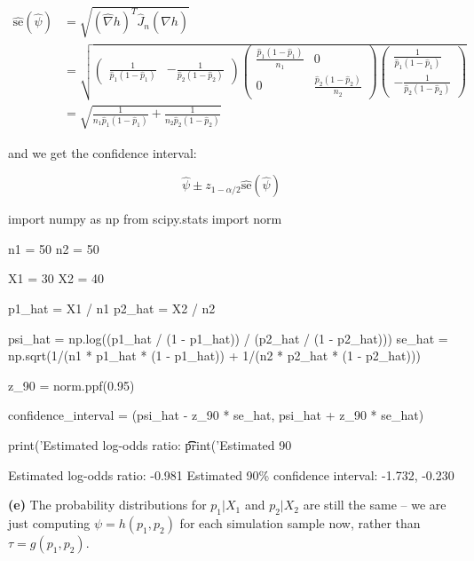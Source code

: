 \begin{align}
\hat{\text{se}}(\hat{\psi}) &= \sqrt{(\hat{\nabla}h)^T \hat{J}_n (\hat{\nabla}h)} \\
&= 
\sqrt{\begin{pmatrix}
\frac{1}{\hat{p}_1(1 - \hat{p}_1)} &
-\frac{1}{\hat{p}_2(1 - \hat{p}_2)}
\end{pmatrix}
\begin{pmatrix}
\frac{\hat{p}_1(1 - \hat{p}_1)}{n_1} & 0 \\
0 & \frac{\hat{p}_2(1 - \hat{p}_2)}{n_2}
\end{pmatrix}
\begin{pmatrix}
\frac{1}{\hat{p}_1(1 - \hat{p}_1)} \\
-\frac{1}{\hat{p}_2(1 - \hat{p}_2)}
\end{pmatrix}} \\
&= \sqrt{\frac{1}{n_1 \hat{p}_1(1 - \hat{p}_1)} + \frac{1}{n_2 \hat{p}_2(1 - \hat{p}_2)}}
\end{align}

and we get the confidence interval:

\[\hat{\psi} \pm z_{1 - \alpha/2} \hat{\text{se}}(\hat{\psi})\]

\begin{python}
import numpy as np
from scipy.stats import norm

n1 = 50
n2 = 50

X1 = 30
X2 = 40

p1_hat = X1 / n1
p2_hat = X2 / n2

psi_hat = np.log((p1_hat / (1 - p1_hat)) / (p2_hat / (1 - p2_hat)))
se_hat = np.sqrt(1/(n1 * p1_hat * (1 - p1_hat)) + 1/(n2 * p2_hat * (1 - p2_hat)))

z_90 = norm.ppf(0.95)

confidence_interval = (psi_hat - z_90 * se_hat, psi_hat + z_90 * se_hat)

print('Estimated log-odds ratio: \t\t %
print('Estimated 90%
\end{python}

\begin{console}
Estimated log-odds ratio:                -0.981
Estimated 90\% confidence interval:       -1.732, -0.230
\end{console}

\textbf{(e)} The probability distributions for \(p_1 | X_1\) and
\(p_2 | X_2\) are still the same -- we are just computing
\(\psi = h(p_1, p_2)\) for each simulation sample now, rather than
\(\tau = g(p_1, p_2)\).

